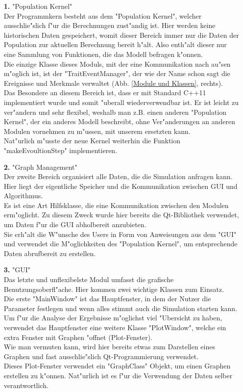 \documentclass[11pt, a4paper, german]{article}
\theoremstyle{plain}
\begin{document}
	\begin{itemize}
		\item [\textbf{1.}] "{}Population Kernel"{}\\
		Der Programmkern besteht aus dem "{}Population Kernel"{}, welcher ausschlie"slich f"ur die Berechnungen zust"andig ist. Hier werden keine historischen Daten gespeichert, womit dieser Bereich immer nur die Daten der Population zur aktuellen Berechnung bereit h"alt. Also enth"alt dieser nur eine Sammlung von Funktionen, die das Modell befragen k"onnen.\\
		Die einzige Klasse dieses Moduls, mit der eine Kommunikation nach au"sen m"oglich ist, ist der "{}TraitEventManager"{}, der wie der Name schon sagt die Ereignisse und Merkmale verwaltet (Abb. \ref{Module und Klassen}, rechts).\\
		Das Besondere an diesem Bereich ist, dass er mit Standard C++11 implementiert wurde und somit "uberall wiederverwendbar ist. Er ist leicht zu ver"andern und sehr flexibel, weshalb man z.B. einen anderen "{}Population Kernel"{}, der ein anderes Modell beschreibt, ohne Ver"anderungen an anderen Modulen vornehmen zu m"ussen, mit unserem ersetzten kann.\\
		Nat"urlich m"usste der neue Kernel weiterhin die Funktion "{}makeEvoultionStep"{} implementieren.
		\item [\textbf{2.}] "{}Graph Management"{}\\
		Der zweite Bereich organisiert alle Daten, die die Simulation anfragen kann. Hier liegt der eigentliche Speicher und die Kommunikation zwischen GUI und Algorithmus.\\
		Es ist eine Art Hilfsklasse, die eine Kommunikation zwischen den Modulen erm"oglicht. Zu diesem Zweck wurde hier bereits die Qt-Bibliothek verwendet, um Daten f"ur die GUI abholbereit anzubieten.\\
		Sie erh"alt die W"unsche des Users in Form von Anweisungen aus dem "{}GUI"{} und verwendet die M"oglichkeiten des "{}Population Kernel"{}, um entsprechende Daten abrufbereit zu erstellen.
		\item [\textbf{3.}] "{}GUI"{}\\
		Das letzte und unflexibelste Modul umfasst die grafische Benutzungsoberfl"ache. Hier kommen zwei wichtige Klassen zum Einsatz.\\
		Die erste "{}MainWindow"{} ist das Hauptfenster, in dem der Nutzer die Parameter festlegen und wenn alles stimmt auch die Simulation starten kann. Um f"ur die Analyse der Ergebnisse m"oglichst viel "Ubersicht zu haben, verwendet das Hauptfenster eine weitere Klasse "{}PlotWindow"{}, welche ein extra Fenster mit Graphen "offnet (Plot-Fenster).\\
		Wie man vermuten kann, wird hier bereits etwas zum Darstellen eines Graphen und fast ausschlie"slich Qt-Programmierung verwendet.\\
		Dieses Plot-Fenster verwendet ein "{}GraphClass"{} Objekt, um einen Graphen erstellen zu k"onnen. Nat"urlich ist es f"ur die Verwendung der Daten selber verantwortlich.
	\end{itemize}	
 	
\end{document}
